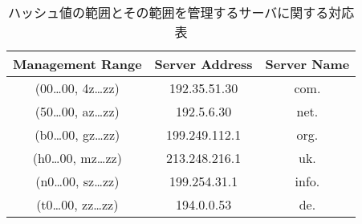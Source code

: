 \begin{table}[htb]
 \centering
 \label{tab:hash-management}
 \caption{ハッシュ値の範囲とその範囲を管理するサーバに関する対応表}
  \begin{tabular}{ccc}
    \hline
    Management Range & Server Address & Server Name \\
    \hline \hline
    (00…00, 4z…zz) & 192.35.51.30 & com.  \\
    (50…00, az…zz) & 192.5.6.30 & net. \\
    (b0…00, gz…zz) & 199.249.112.1 & org. \\
    (h0…00, mz…zz) & 213.248.216.1 & uk. \\
    (n0…00, sz…zz) & 199.254.31.1 & info. \\
    (t0…00, zz…zz) & 194.0.0.53 & de. \\
    \hline
  \end{tabular}
\end{table}
